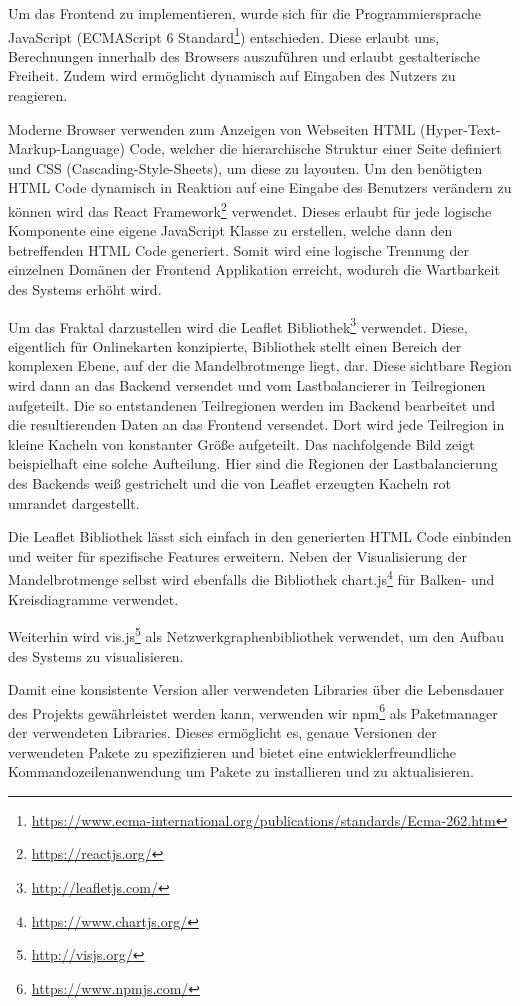 Um das Frontend zu implementieren, wurde sich für die Programmiersprache JavaScript (ECMAScript 6 Standard\footnote{\url{https://www.ecma-international.org/publications/standards/Ecma-262.htm}}) entschieden. Diese erlaubt uns, Berechnungen innerhalb des Browsers auszuführen und erlaubt gestalterische Freiheit. Zudem wird ermöglicht dynamisch auf Eingaben des Nutzers zu reagieren.

Moderne Browser verwenden zum Anzeigen von Webseiten HTML (Hyper-Text-Markup-Language) Code, welcher die hierarchische Struktur einer Seite definiert und CSS (Cascading-Style-Sheets), um diese zu layouten. Um den benötigten HTML Code dynamisch in Reaktion auf eine Eingabe des Benutzers verändern zu können wird das React Framework\footnote{\url{https://reactjs.org/}} verwendet. Dieses erlaubt für jede logische Komponente eine eigene JavaScript Klasse zu erstellen, welche dann den betreffenden HTML Code generiert. Somit wird eine logische Trennung der einzelnen Domänen der Frontend Applikation erreicht, wodurch die Wartbarkeit des Systems erhöht wird.

Um das Fraktal darzustellen wird die Leaflet Bibliothek\footnote{\url{http://leafletjs.com/}} verwendet. Diese, eigentlich für Onlinekarten konzipierte, Bibliothek stellt einen Bereich der komplexen Ebene, auf der die Mandelbrotmenge liegt, dar. Diese sichtbare Region wird dann an das Backend versendet und vom Lastbalancierer  in Teilregionen aufgeteilt. Die so entstandenen Teilregionen werden im Backend bearbeitet und die resultierenden Daten an das Frontend versendet. Dort wird jede Teilregion in kleine Kacheln von konstanter Größe aufgeteilt. Das nachfolgende Bild zeigt beispielhaft eine solche Aufteilung. Hier sind die Regionen der Lastbalancierung des Backends weiß gestrichelt und die von Leaflet erzeugten Kacheln rot umrandet dargestellt.

Die Leaflet Bibliothek lässt sich einfach in den generierten HTML Code einbinden und weiter für spezifische Features erweitern.
Neben der Visualisierung der Mandelbrotmenge selbst wird ebenfalls die Bibliothek chart.js\footnote{\url{https://www.chartjs.org/}} für Balken- und Kreisdiagramme verwendet.

Weiterhin wird vis.js\footnote{\url{http://visjs.org/}} als Netzwerkgraphenbibliothek verwendet, um den Aufbau des Systems zu visualisieren. 

Damit eine konsistente Version aller verwendeten Libraries über die Lebensdauer des Projekts gewährleistet werden kann, verwenden wir npm\footnote{\url{https://www.npmjs.com/}} als Paketmanager der verwendeten Libraries. Dieses ermöglicht es, genaue Versionen der verwendeten Pakete zu spezifizieren und bietet eine entwicklerfreundliche Kommandozeilenanwendung um Pakete zu installieren und zu aktualisieren.

